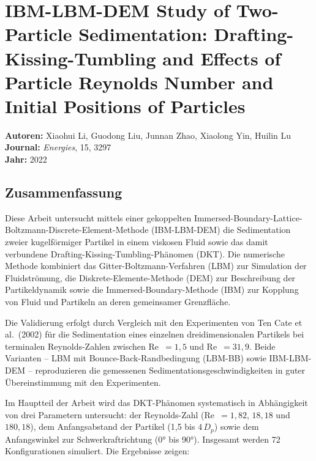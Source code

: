 \documentclass[a4paper,12pt]{article}
\begin{document}
\section*{IBM-LBM-DEM Study of Two-Particle Sedimentation: Drafting-Kissing-Tumbling and Effects of Particle Reynolds Number and Initial Positions of Particles}
\textbf{Autoren:} Xiaohui Li, Guodong Liu, Junnan Zhao, Xiaolong Yin, Huilin Lu \\
\textbf{Journal:} \emph{Energies}, 15, 3297 \\
\textbf{Jahr:} 2022

\subsection*{Zusammenfassung}

Diese Arbeit untersucht mittels einer gekoppelten Immersed-Boundary-Lattice-Boltzmann-Discrete-Element-Methode (IBM-LBM-DEM) die Sedimentation zweier kugelförmiger Partikel in einem viskosen Fluid sowie das damit verbundene Drafting-Kissing-Tumbling-Phänomen (DKT). Die numerische Methode kombiniert das Gitter-Boltzmann-Verfahren (LBM) zur Simulation der Fluidströmung, die Diskrete-Elemente-Methode (DEM) zur Beschreibung der Partikeldynamik sowie die Immersed-Boundary-Methode (IBM) zur Kopplung von Fluid und Partikeln an deren gemeinsamer Grenzfläche.

Die Validierung erfolgt durch Vergleich mit den Experimenten von Ten Cate et al.\ (2002) für die Sedimentation eines einzelnen dreidimensionalen Partikels bei terminalen Reynolds-Zahlen zwischen Re~$= 1{,}5$ und Re~$= 31{,}9$. Beide Varianten -- LBM mit Bounce-Back-Randbedingung (LBM-BB) sowie IBM-LBM-DEM -- reproduzieren die gemessenen Sedimentationsgeschwindigkeiten in guter Übereinstimmung mit den Experimenten.

Im Hauptteil der Arbeit wird das DKT-Phänomen systematisch in Abhängigkeit von drei Parametern untersucht: der Reynolds-Zahl (Re~$= 1{,}82$, $18{,}18$ und $180{,}18$), dem Anfangsabstand der Partikel (1,5 bis $4\,D_p$) sowie dem Anfangswinkel zur Schwerkraftrichtung (0° bis 90°). Insgesamt werden 72 Konfigurationen simuliert. Die Ergebnisse zeigen:
\end{document}
